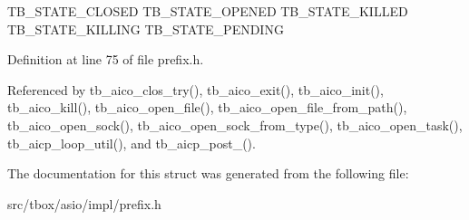 \begin{DoxyPre}
TB\_STATE\_CLOSED
TB\_STATE\_OPENED
TB\_STATE\_KILLED
TB\_STATE\_KILLING
TB\_STATE\_PENDING
\end{DoxyPre}
 

Definition at line 75 of file prefix.\-h.



Referenced by tb\-\_\-aico\-\_\-clos\-\_\-try(), tb\-\_\-aico\-\_\-exit(), tb\-\_\-aico\-\_\-init(), tb\-\_\-aico\-\_\-kill(), tb\-\_\-aico\-\_\-open\-\_\-file(), tb\-\_\-aico\-\_\-open\-\_\-file\-\_\-from\-\_\-path(), tb\-\_\-aico\-\_\-open\-\_\-sock(), tb\-\_\-aico\-\_\-open\-\_\-sock\-\_\-from\-\_\-type(), tb\-\_\-aico\-\_\-open\-\_\-task(), tb\-\_\-aicp\-\_\-loop\-\_\-util(), and tb\-\_\-aicp\-\_\-post\-\_\-().



The documentation for this struct was generated from the following file\-:\begin{DoxyCompactItemize}
\item 
src/tbox/asio/impl/prefix.\-h\end{DoxyCompactItemize}
